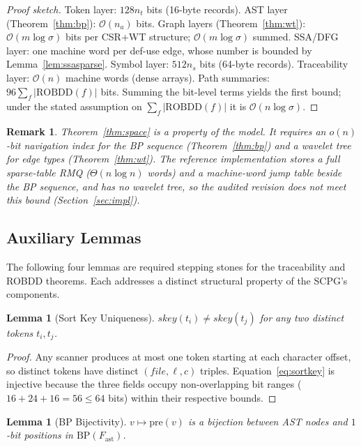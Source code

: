 \documentclass[journal,10pt,twoside]{IEEEtran}
\newtheorem{lemma}[theorem]{Lemma}
\newtheorem{remark}{Remark}[section]
\newcommand{\ROBDD}{\mathrm{ROBDD}}
\newcommand{\BigO}{\mathcal{O}}
\newcommand{\sortkey}{\mathit{skey}}
\newcommand{\pre}{\mathrm{pre}}
\begin{document}
\begin{proof}[Proof sketch]
Token layer: $128n_t$ bits (16-byte records).
AST layer (Theorem~\ref{thm:bp}): $\BigO(n_a)$ bits.
Graph layers (Theorem~\ref{thm:wt}): $\BigO(m\log\sigma)$
bits per CSR+WT structure; $\BigO(m\log\sigma)$ summed.
SSA/DFG layer: one machine word per def-use edge, whose
number is bounded by Lemma~\ref{lem:ssasparse}.
Symbol layer: $512n_s$ bits (64-byte records).
Traceability layer: $\BigO(n)$ machine words (dense arrays).
Path summaries: $96\sum_f|\ROBDD(f)|$ bits.
Summing the bit-level terms yields the first bound; under the
stated assumption on $\sum_f|\ROBDD(f)|$ it is
$\BigO(n\log\sigma)$.
\end{proof}

\begin{remark}
Theorem~\ref{thm:space} is a property of the model.  It
requires an $o(n)$-bit navigation index for the BP sequence
(Theorem~\ref{thm:bp}) and a wavelet tree for edge types
(Theorem~\ref{thm:wt}).  The reference implementation stores
a full sparse-table RMQ ($\Theta(n\log n)$ words) and a
machine-word jump table beside the BP sequence, and has no
wavelet tree, so the audited revision does not meet this
bound (Section~\ref{sec:impl}).
\end{remark}

\subsection{Auxiliary Lemmas}

The following four lemmas are required stepping stones for
the traceability and ROBDD theorems.  Each addresses a
distinct structural property of the SCPG's components.

\begin{lemma}[Sort Key Uniqueness]\label{lem:sortkey}
$\sortkey(t_i) \ne \sortkey(t_j)$ for any two distinct
tokens $t_i, t_j$.
\end{lemma}

\begin{proof}
Any scanner produces at most one token starting at each
character offset, so distinct tokens have distinct
$(\mathit{file}, \ell, c)$ triples.
Equation~\eqref{eq:sortkey} is injective because
the three fields occupy non-overlapping bit ranges
($16 + 24 + 16 = 56 \le 64$ bits) within their respective
bounds.
\end{proof}

\begin{lemma}[BP Bijectivity]\label{lem:bpbij}
$v \mapsto \pre(v)$ is a bijection between AST nodes and
$1$-bit positions in $\mathrm{BP}(F_{\mathrm{ast}})$.
\end{lemma}
\end{document}
